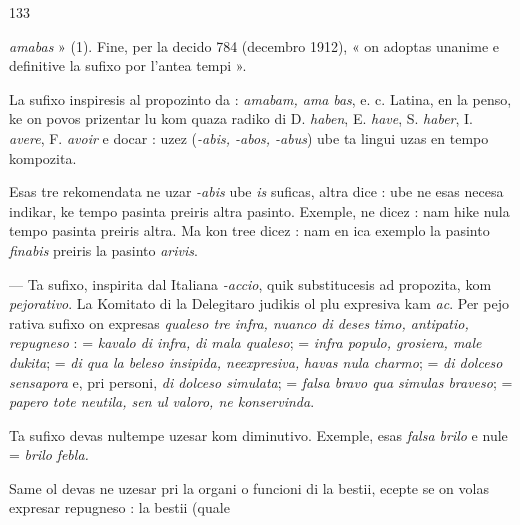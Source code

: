 \begin{VUpage}[137]{133}

\VUcontinue
\textit{amabas} » (1). Fine, per la decido 784 (decembro 1912),\nl
« on adoptas unanime e definitive la sufixo  por l'antea\nl
tempi ».

La sufixo  inspiresis al propozinto da : \textit{amabam, ama}\cc
\textit{bas}, e. c. Latina, en la penso, ke on povos prizentar lu kom\nl
quaza radiko di D. \textit{haben}, E. \textit{have}, S. \textit{haber}, I. \textit{avere}, F. \textit{avoir}\nl
e docar : uzez  (\textit{-abis, -abos, -abus}) ube ta lingui uzas \nl
en tempo kompozita.

Esas tre rekomendata ne uzar \textit{-abis} ube \textit{is} suficas, altra\cc
dice : ube ne esas necesa indikar, ke tempo pasinta preiris\nl
altra pasinto. Exemple, ne dicez : \nl
{} nam hike nula tempo pasinta preiris altra. Ma kon\cc
tree dicez :  nam en\nl
ica exemplo la pasinto \textit{finabis} preiris la pasinto \textit{arivis}.

 --- Ta sufixo, inspirita dal Italiana \textit{-accio}, quik\nl
substitucesis ad  propozita, kom \textit{pejorativo}. La Komitato\nl
di la Delegitaro judikis ol plu expresiva kam \textit{ac}. Per pejo\cc
rativa sufixo on expresas \textit{qualeso tre infra, nuanco di deses}\cc
\textit{timo, antipatio, repugneso} :  = \textit{kavalo di infra,}\nl
\textit{di mala qualeso};  = \textit{infra populo, grosiera, male}\cc
\textit{dukita};  = \textit{di qua la beleso insipida, neexpresiva,}\nl
\textit{havas nula charmo};  = \textit{di dolceso sensapora} e, pri\nl
personi, \textit{di dolceso simulata};  = \textit{falsa bravo qua}\nl
\textit{simulas braveso};  = \textit{papero tote neutila, sen ul}\nl
\textit{valoro, ne konservinda}. \nl
{}\nl
{}

Ta sufixo devas nultempe uzesar kom diminutivo.\nl
Exemple,  esas \textit{falsa brilo} e nule  = \textit{brilo}\nl
\textit{febla.}

Same ol devas ne uzesar pri la organi o funcioni di la\nl
bestii, ecepte se on volas expresar repugneso : la bestii (quale\parplein
\end{VUpage}

